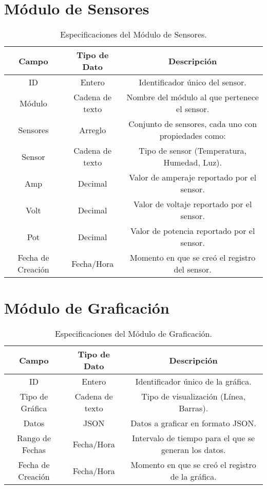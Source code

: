 \section{Módulo de Sensores}
\begin{table}[h!]
    \centering
    \begin{tabular}{|c|c|c|}
    \hline
    \rowcolor[HTML]{FCE8B2} 
    \textbf{Campo} & \textbf{Tipo de Dato} & \textbf{Descripción} \\ \hline
    ID & Entero & Identificador único del sensor. \\ \hline
    Módulo & Cadena de texto & Nombre del módulo al que pertenece el sensor. \\ \hline
    Sensores & Arreglo & Conjunto de sensores, cada uno con propiedades como: \\ \hline
    \hspace{5mm} Sensor & Cadena de texto & Tipo de sensor (Temperatura, Humedad, Luz). \\ \hline
    \hspace{5mm} Amp & Decimal & Valor de amperaje reportado por el sensor. \\ \hline
    \hspace{5mm} Volt & Decimal & Valor de voltaje reportado por el sensor. \\ \hline
    \hspace{5mm} Pot & Decimal & Valor de potencia reportado por el sensor. \\ \hline
    Fecha de Creación & Fecha/Hora & Momento en que se creó el registro del sensor. \\ \hline
    \end{tabular}
    \caption{Especificaciones del Módulo de Sensores.}
\end{table}

\section{Módulo de Graficación}
\begin{table}[h!]
    \centering
    \begin{tabular}{|c|c|c|}
    \hline
    \rowcolor[HTML]{FCE8B2} 
    \textbf{Campo} & \textbf{Tipo de Dato} & \textbf{Descripción} \\ \hline
    ID & Entero & Identificador único de la gráfica. \\ \hline
    Tipo de Gráfica & Cadena de texto & Tipo de visualización (Línea, Barras). \\ \hline
    Datos & JSON & Datos a graficar en formato JSON. \\ \hline
    Rango de Fechas & Fecha/Hora & Intervalo de tiempo para el que se generan los datos. \\ \hline
    Fecha de Creación & Fecha/Hora & Momento en que se creó el registro de la gráfica. \\ \hline
    \end{tabular}
    \caption{Especificaciones del Módulo de Graficación.}
\end{table}

